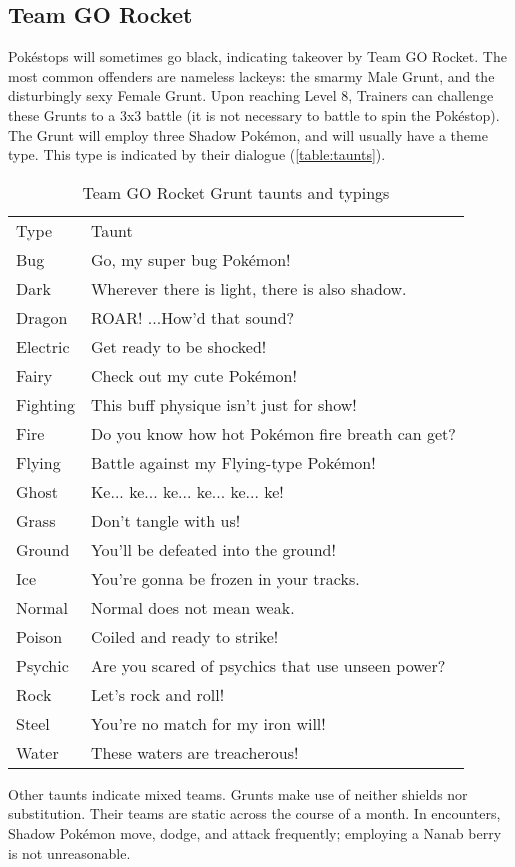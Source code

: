 \subsection{Team GO Rocket\label{subsec:rocket}}
Pokéstops will sometimes go black, indicating takeover by Team GO Rocket.
The most common offenders are nameless lackeys: the smarmy Male Grunt, and the disturbingly sexy Female Grunt.
Upon reaching Level 8, Trainers can challenge these Grunts to a 3x3 battle (it is not necessary to battle to spin the Pokéstop).
The Grunt will employ three Shadow Pokémon, and will usually have a theme type.
This type is indicated by their dialogue (\autoref{table:taunts}).
\begin{table}
\centering
\begin{tabular}{ll}
Type & Taunt\\
\Midrule
  Bug & Go, my super bug Pokémon!\\
  Dark & Wherever there is light, there is also shadow.\\
  Dragon & ROAR! ...How'd that sound?\\
  Electric & Get ready to be shocked!\\
  Fairy & Check out my cute Pokémon!\\
  Fighting & This buff physique isn't just for show!\\
  Fire & Do you know how hot Pokémon fire breath can get?\\
  Flying & Battle against my Flying-type Pokémon!\\
  Ghost & Ke... ke... ke... ke... ke... ke!\\
  Grass & Don't tangle with us!\\
  Ground & You'll be defeated into the ground!\\
  Ice & You're gonna be frozen in your tracks.\\
  Normal & Normal does not mean weak.\\
  Poison & Coiled and ready to strike!\\
  Psychic & Are you scared of psychics that use unseen power?\\
  Rock & Let's rock and roll!\\
  Steel & You're no match for my iron will!\\
  Water & These waters are treacherous!\\
\end{tabular}
  \caption{Team GO Rocket Grunt taunts and typings\label{table:taunts}}
\end{table}
Other taunts indicate mixed teams.
Grunts make use of neither shields nor substitution.
Their teams are static across the course of a month.
In encounters, Shadow Pokémon move, dodge, and attack frequently; employing a Nanab berry is not unreasonable.

